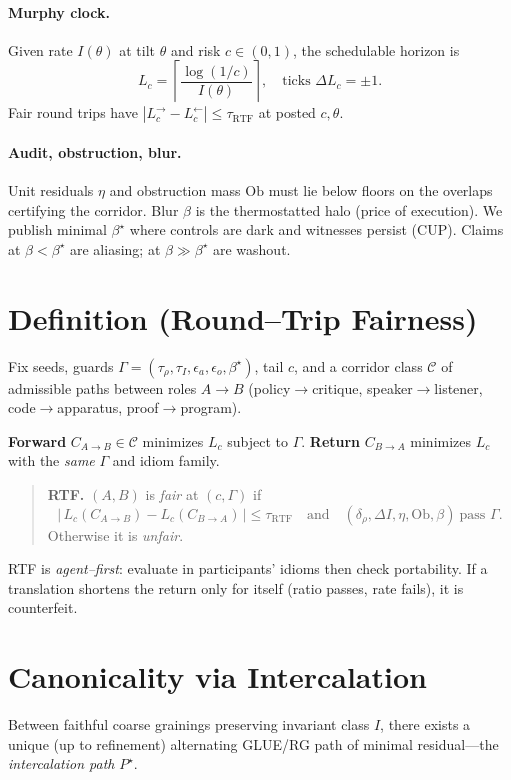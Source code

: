 \documentclass[11pt]{article}
\begin{document}
\paragraph{Murphy clock.}
Given rate $I(\theta)$ at tilt $\theta$ and risk $c\in(0,1)$, the schedulable horizon is
\[
L_c=\left\lceil\frac{\log(1/c)}{I(\theta)}\right\rceil,\quad\text{ticks } \Delta L_c=\pm 1.
\]
Fair round trips have $|L_c^{\rightarrow}-L_c^{\leftarrow}|\le\tau_{\text{RTF}}$ at posted $c,\theta$.

\paragraph{Audit, obstruction, blur.}
Unit residuals $\eta$ and obstruction mass $\mathrm{Ob}$ must lie below floors on the overlaps certifying the corridor. Blur $\beta$ is the thermostatted halo (price of execution). We publish minimal $\beta^\star$ where controls are dark and witnesses persist (CUP). Claims at $\beta<\beta^\star$ are aliasing; at $\beta\gg\beta^\star$ are washout.

\section{Definition (Round--Trip Fairness)}
Fix seeds, guards $\Gamma=(\tau_\rho,\tau_I,\epsilon_a,\epsilon_o,\beta^\star)$, tail $c$, and a corridor class $\mathcal{C}$ of admissible paths between roles $A\!\to\!B$ (policy$\to$critique, speaker$\to$listener, code$\to$apparatus, proof$\to$program).

\medskip
\noindent\textbf{Forward} $C_{A\to B}\in\mathcal{C}$ minimizes $L_c$ subject to $\Gamma$.\quad
\textbf{Return} $C_{B\to A}$ minimizes $L_c$ with the \emph{same} $\Gamma$ and idiom family.

\begin{quote}
\textbf{RTF.} $(A,B)$ is \emph{fair} at $(c,\Gamma)$ if
\[
\big|\,L_c(C_{A\to B})-L_c(C_{B\to A})\,\big|\le \tau_{\text{RTF}}
\quad\text{and}\quad
(\delta_\rho,\Delta I,\eta,\mathrm{Ob},\beta)\ \text{pass }\Gamma.
\]
Otherwise it is \emph{unfair}.
\end{quote}

\noindent RTF is \emph{agent--first}: evaluate in participants' idioms then check portability. If a translation shortens the return only for itself (ratio passes, rate fails), it is counterfeit.

\section{Canonicality via Intercalation}
Between faithful coarse grainings preserving invariant class $I$, there exists a unique (up to refinement) alternating GLUE/RG path of minimal residual---the \emph{intercalation path} $P^\star$.
\end{document}
